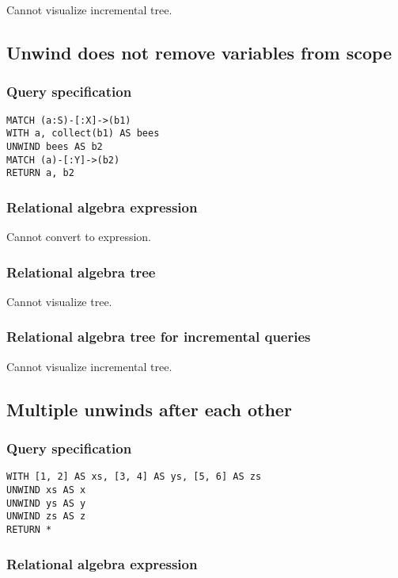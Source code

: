 Cannot visualize incremental tree.

\subsection{Unwind does not remove variables from scope}

\subsubsection*{Query specification}

\begin{lstlisting}
MATCH (a:S)-[:X]->(b1)
WITH a, collect(b1) AS bees
UNWIND bees AS b2
MATCH (a)-[:Y]->(b2)
RETURN a, b2
\end{lstlisting}

\subsubsection*{Relational algebra expression}

Cannot convert to expression.

\subsubsection*{Relational algebra tree}

Cannot visualize tree.

\subsubsection*{Relational algebra tree for incremental queries}

Cannot visualize incremental tree.

\subsection{Multiple unwinds after each other}

\subsubsection*{Query specification}

\begin{lstlisting}
WITH [1, 2] AS xs, [3, 4] AS ys, [5, 6] AS zs
UNWIND xs AS x
UNWIND ys AS y
UNWIND zs AS z
RETURN *
\end{lstlisting}

\subsubsection*{Relational algebra expression}

